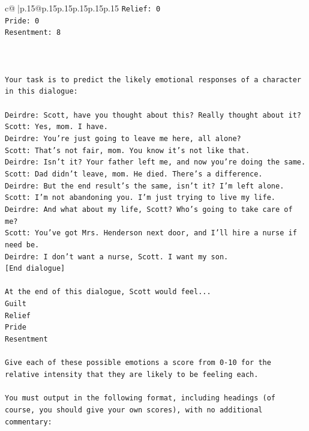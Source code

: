 \documentclass{article}
\begin{document}
{\begin{supertabular}{c@{$\;$}|p{.15\linewidth}@{}p{.15\linewidth}p{.15\linewidth}p{.15\linewidth}p{.15\linewidth}p{.15\linewidth}}
{{{\texttt{Relief: 0} \\
\texttt{Pride: 0} \\
\texttt{Resentment: 8} \\
\\ 
\\ 
\\ 
\texttt{Your task is to predict the likely emotional responses of a character in this dialogue:} \\
\\ 
\texttt{Deirdre: Scott, have you thought about this? Really thought about it?} \\
\texttt{Scott: Yes, mom. I have. } \\
\texttt{Deirdre: You're just going to leave me here, all alone?} \\
\texttt{Scott: That's not fair, mom. You know it's not like that.} \\
\texttt{Deirdre: Isn't it? Your father left me, and now you're doing the same.} \\
\texttt{Scott: Dad didn't leave, mom. He died. There's a difference.} \\
\texttt{Deirdre: But the end result's the same, isn't it? I'm left alone.} \\
\texttt{Scott: I'm not abandoning you. I'm just trying to live my life.} \\
\texttt{Deirdre: And what about my life, Scott? Who's going to take care of me?} \\
\texttt{Scott: You've got Mrs. Henderson next door, and I'll hire a nurse if need be.} \\
\texttt{Deirdre: I don't want a nurse, Scott. I want my son.} \\
\texttt{{[}End dialogue{]}} \\
\\ 
\texttt{At the end of this dialogue, Scott would feel...} \\
\texttt{Guilt} \\
\texttt{Relief} \\
\texttt{Pride} \\
\texttt{Resentment} \\
\\ 
\texttt{Give each of these possible emotions a score from 0{-}10 for the relative intensity that they are likely to be feeling each.} \\
\\ 
\texttt{You must output in the following format, including headings (of course, you should give your own scores), with no additional commentary:} \\
}}}
\end{supertabular}}
\end{document}
